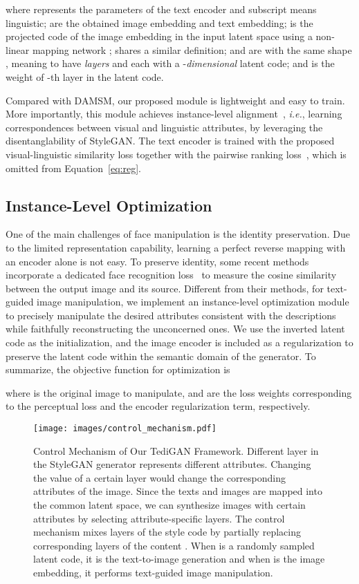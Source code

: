 \documentclass[final]{cvpr}
\def\ie{\emph{i.e.}}
\begin{document}
where  represents the parameters of the text encoder  and subscript  means linguistic;
 are the obtained image embedding and text embedding; 
 is the projected code of the image embedding  in the input latent space  using a non-linear mapping network ;  shares a similar definition;
 and  are with the same shape , meaning to have  \textit{layers} and each with a -\textit{dimensional} latent code;
and  is the weight of -th layer in the latent code.

Compared with DAMSM, our proposed module is lightweight and easy to train. More importantly, this module achieves instance-level alignment~\cite{Wang2020CVSE}, \ie, learning correspondences between visual and linguistic attributes, by leveraging the disentanglability of StyleGAN.
The text encoder is trained with the proposed visual-linguistic similarity loss together with the pairwise ranking loss~\cite{kiros2014unifying,dong2017semantic}, which is omitted from Equation~\ref{eq:reg}.

\subsection{Instance-Level Optimization}
\label{subsec:instance-level-optimization}
One of the main challenges of face manipulation is the identity preservation. Due to the limited representation capability, learning a perfect reverse mapping with an encoder alone is not easy. 
To preserve identity, some recent methods~\cite{ververas2020slidergan,richardson2020encoding} incorporate a dedicated face recognition loss~\cite{deng2019arcface} to measure the cosine similarity between the output image and its source.
Different from their methods, for text-guided image manipulation, we implement an instance-level optimization module to precisely manipulate the desired attributes consistent with the descriptions while faithfully reconstructing the unconcerned ones.  
We use the inverted latent code  as the initialization, and the image encoder is included as a regularization to preserve the latent code within the semantic domain of the generator. 
To summarize, the objective function for optimization is

where  is the original image to manipulate,  and  are the loss weights corresponding to the perceptual loss and the encoder regularization term, respectively.

\begin{figure}[t]
\centering
\texttt{[image: images/control\_mechanism.pdf]}
\caption{Control Mechanism of Our TediGAN Framework.
Different layer in the StyleGAN generator represents different attributes. 
Changing the value of a certain layer would change the corresponding attributes of the image.
Since the texts and images are mapped into the common latent space, we can synthesize images with certain attributes by selecting attribute-specific layers.
The control mechanism mixes layers of the style code  by partially replacing corresponding layers of the content .
When  is a randomly sampled latent code, it is the text-to-image generation and when  is the image embedding, it performs text-guided image manipulation. 
}
\label{fig:control_mechanism}
\end{figure}
\end{document}
